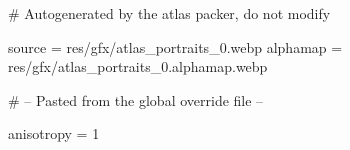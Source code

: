 # Autogenerated by the atlas packer, do not modify

source = res/gfx/atlas_portraits_0.webp
alphamap = res/gfx/atlas_portraits_0.alphamap.webp

# -- Pasted from the global override file --

anisotropy = 1
